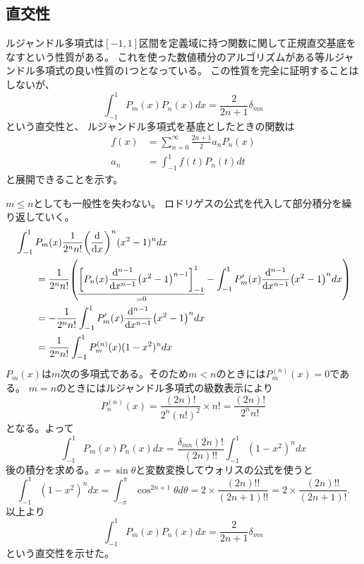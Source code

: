 \documentclass[../../master.tex]{subfiles}
\begin{document}
\subsection{直交性}
ルジャンドル多項式は\([-1, 1]\)区間を定義域に持つ関数に関して正規直交基底をなすという性質がある。
これを使った数値積分のアルゴリズムがある等ルジャンドル多項式の良い性質の1つとなっている。
この性質を完全に証明することはしないが、
\begin{equation}
	\int_{-1}^{1} P_m(x) P_n(x) dx = \frac{2}{2n+1}\delta_{mn}
\end{equation}
という直交性と、
ルジャンドル多項式を基底としたときの関数は
\begin{align}
	f(x) & = \sum_{n=0}^{\infty} \frac{2n+1}{2}a_n P_n(x) \\
	a_n  & =\int_{-1}^{1}f(t)P_n(t) dt
\end{align}
と展開できることを示す。

\(m\leq n\)としても一般性を失わない。
ロドリゲスの公式を代入して部分積分を繰り返していく。
\begin{align}
	 & \int_{-1}^{1} P_m(x) \frac{1}{2^n n!} \qty(\dv{x})^n (x^2-1)^n dx \notag \\
	 & \qquad = \frac{1}{2^n n!}
	\qty(
	\underset{=0}{\underline{
			\qty[P_n(x)\dv[n-1]{x}(x^2-1)^{n-1}]_{-1}^{1}
		}}
	- \int_{-1}^{1}P_m'(x)\dv[n-1]{x}(x^2-1)^n dx
	)                                                                           \\
	 & \qquad=-\frac{1}{2^n n!}\int_{-1}^{1}P_m'(x)\dv[n-1]{x}(x^2-1)^n dx      \\
	 & \qquad=\frac{1}{2^n n!}\int_{-1}^{1} P_m^{(n)}(x)(1-x^2)^n dx
\end{align}
\(P_m(x)\)は\(m\)次の多項式である。そのため\(m<n\)のときには\(P_m^{(n)}(x)=0\)である。
\(m=n\)のときにはルジャンドル多項式の級数表示により
\begin{equation}
	P_n^{(n)}(x) = \frac{(2n)!}{2^n (n!)^2}\times n! = \frac{(2n)!}{2^n n!}
\end{equation}
となる。よって
\begin{equation}
	\int_{-1}^{1} P_m(x) P_n(x) dx
	= \frac{\delta_{mn}(2n)!}{(2n)!!}\int_{-1}^{1} (1-x^2)^n dx
\end{equation}
後の積分を求める。\(x=\sin\theta\)と変数変換してウォリスの公式を使うと
\begin{equation}
	\int_{-1}^{1} (1-x^2)^n dx
	= \int_{-\pi}^{\pi} \cos^{2n+1} \theta d\theta
	= 2 \times \frac{(2n)!!}{(2n+1)!!} = 2 \times \frac{(2n)!!}{(2n+1)!}.
\end{equation}
以上より
\begin{equation}
	\int_{-1}^{1} P_m(x) P_n(x) dx = \frac{2}{2n+1}\delta_{mn}
\end{equation}
という直交性を示せた。
\end{document}
